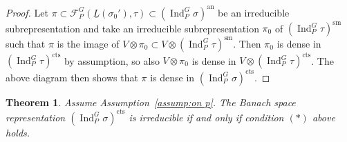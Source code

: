 \documentclass[a4paper]{amsart}
\numberwithin{equation}{section}
\newtheorem{thm}{Theorem}[section]
\theoremstyle{remark}
\theoremstyle{definition}
\DeclareMathOperator{\Ind}{Ind}
\newcommand{\sm}{\mathrm{sm}}
\newcommand{\an}{\mathrm{an}}
\newcommand{\cts}{\mathrm{cts}}
\begin{document}
\begin{proof}
Let $\pi\subset \mathcal{F}_{P}^{G}(\underline{L}(\sigma_{0}'),\tau) \subset (\Ind_{P}^{G} \sigma)^{\an}$
be an irreducible subrepresentation and take an irreducible subrepresentation $\pi_{0}$ of $(\Ind_{P}^{G} \tau)^{\sm}$ such that $\pi$ is the image of $V\otimes\pi_{0} \subset V\otimes (\Ind_{P}^{G}\tau)^{\sm}$.
Then $\pi_{0}$ is dense in $(\Ind_{P}^{G}\tau)^{\cts}$ by assumption, so also $V \otimes \pi_0$ is dense in $V \otimes (\Ind_{P}^{G}\tau)^{\cts}$.
The above diagram then shows that $\pi$ is dense in $(\Ind_{P}^{G} \sigma)^{\cts}$.
\end{proof}

\begin{thm}\label{thm:main2}
Assume Assumption~\ref{assump:on p}.
  The Banach space representation $(\Ind_P^G \sigma)^{\cts}$ is irreducible if and only if condition $(*)$ above holds.
\end{thm}
\end{document}
